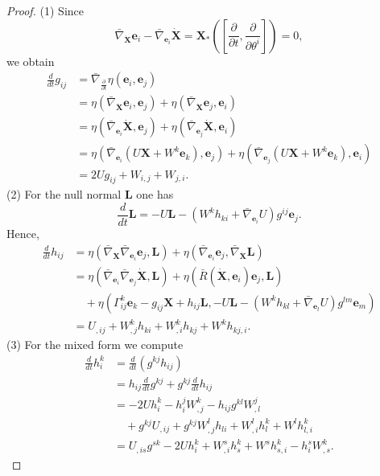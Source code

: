 \documentclass[reqno,11pt, letterpaper]{amsart}
\theoremstyle{plain}
\theoremstyle{definition}
\numberwithin{equation}{section}
\begin{document}
\begin{proof}
	(1) Since
	\[
	\bar{\nabla}_{\dot{\mathbf{X}}}\mathbf{e}_i - \bar{\nabla}_{\mathbf{e}_i}\dot{\mathbf{X}}
	= \mathbf{X}_*\left(\left[\frac{\partial}{\partial t}, \frac{\partial}{\partial \theta^i}\right]\right)= 0,
	\]
	we obtain
	\begin{align*}
		\frac{d}{dt} g_{ij}
		&= \bar{\nabla}_{\frac{\partial}{\partial t}} \eta(\mathbf{e}_i,\mathbf{e}_j) \\
		&= \eta(\bar{\nabla}_{\dot{\mathbf{X}}}\mathbf{e}_i,\mathbf{e}_j)
		+ \eta(\bar{\nabla}_{\dot{\mathbf{X}}}\mathbf{e}_j,\mathbf{e}_i) \\
		&= \eta(\bar{\nabla}_{\mathbf{e}_i}\dot{\mathbf{X}},\mathbf{e}_j)
		+ \eta(\bar{\nabla}_{\mathbf{e}_j}\dot{\mathbf{X}},\mathbf{e}_i) \\
		&= \eta(\bar{\nabla}_{\mathbf{e}_i}(U\mathbf{X}+W^k\mathbf{e}_k),\mathbf{e}_j)
		+ \eta(\bar{\nabla}_{\mathbf{e}_j}(U\mathbf{X}+W^k\mathbf{e}_k),\mathbf{e}_i) \\
		&= 2U g_{ij} + W_{i,j} + W_{j,i}.
	\end{align*}
	(2) For the null normal $\mathbf{L}$ one has
	\[
	\frac{d}{dt}\mathbf{L} = -U\mathbf{L} - (W^k h_{ki} + \bar{\nabla}_{\mathbf{e}_i}U) g^{ij}\mathbf{e}_j.
	\]
	Hence,
	\begin{align*}
		\frac{d}{dt} h_{ij}
		&= \eta(\bar{\nabla}_{\dot{\mathbf{X}}}\bar{\nabla}_{\mathbf{e}_i}\mathbf{e}_j,\mathbf{L})
		+ \eta(\bar{\nabla}_{\mathbf{e}_i}\mathbf{e}_j,\bar{\nabla}_{\dot{\mathbf{X}}}\mathbf{L}) \\
		&= \eta(\bar{\nabla}_{\mathbf{e}_i}\bar{\nabla}_{\mathbf{e}_j}\dot{\mathbf{X}},\mathbf{L})
		+ \eta(\bar{R}(\dot{\mathbf{X}},\mathbf{e}_i)\mathbf{e}_j,\mathbf{L}) \\
		&\quad + \eta(\Gamma^k_{ij}\mathbf{e}_k - g_{ij}\mathbf{X} + h_{ij}\mathbf{L},
		-U\mathbf{L} - (W^k h_{kl} + \bar{\nabla}_{\mathbf{e}_l}U) g^{lm}\mathbf{e}_m) \\
		&= U_{,ij} + W^k_{,j} h_{ki} + W^k_{,i} h_{kj} + W^k h_{kj,i}.
	\end{align*}
	(3) For the mixed form we compute
	\begin{align*}
		\frac{d}{dt} h_i^k
		&= \frac{d}{dt}(g^{kj} h_{ij}) \\
		&= h_{ij}\frac{d}{dt} g^{kj} + g^{kj}\frac{d}{dt} h_{ij} \\
		&= -2U h_i^k - h_i^j W_{,j}^k - h_{ij} g^{kl} W_{,l}^j \\
		&\quad + g^{kj} U_{,ij} + g^{kj} W^l_{,j} h_{li} + W^l_{,i} h_l^k + W^l h_{l,i}^k \\
		&= U_{,is} g^{sk} - 2U h_i^k + W^s_{,i} h_s^k + W^s h_{s,i}^k - h_i^s W^k_{,s}.
	\end{align*}
\end{proof}
\end{document}
